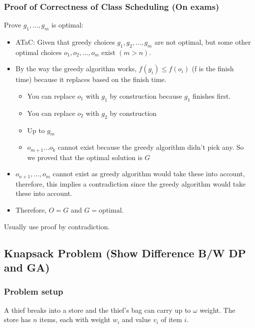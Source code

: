 \subsubsection{Proof of Correctness of Class Scheduling (On exams)}
\begin{derivation}

    Prove $g_1,\ldots,g_m$ is optimal:
    \begin{itemize}
        \item ATaC: Given that greedy choices $g_1, g_2, \dots, g_m$ are not optimal, but some other optimal choices $o_1, o_2, \dots, o_m$ exist $(m > n)$. 
        \item By the way the greedy algorithm works, $f(g_i) \leq f(o_i)$ (f is the finish time) because it replaces based on the finish time. 
        \begin{itemize}
            \item You can replace $o_1$ with $g_1$ by construction because $g_1$ finishes first. 
            \item You can replace $o_2$ with $g_2$ by construction
            \item Up to $g_m$
            \item $o_{m+1} \ldots o_k$ cannot exist because the greedy algorithm didn't pick any. So we proved that the optimal solution is $G$
        \end{itemize}
        \item $o_{n+1},\dots, o_m$ cannot exist as greedy algorithm would take these into account, therefore, this implies a contradiction since the greedy algorithm would take these into account.
        \item Therefore, $O=G$ and $G=\text{optimal}$.
    \end{itemize}
\end{derivation}

\begin{warning}
    Usually use proof by contradiction. 
\end{warning}

\subsection{Knapsack Problem (Show Difference B/W DP and GA)}

\subsubsection{Problem setup}
\begin{intuition}
A thief breaks into a store and the thief's bag can carry up to $\omega$ weight. The store has $n$ items, each with weight $w_i$ and value $v_i$ of item $i$.
\end{intuition}

